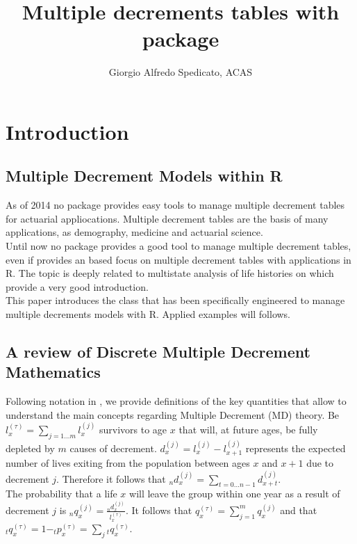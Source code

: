 \documentclass[nojss]{jss}
\author{Giorgio Alfredo Spedicato, ACAS}
\title{Multiple decrements tables with \pkg{lifecontingencies} package}
\begin{document}






\section{Introduction}

\subsection{Multiple Decrement Models within R}

As of 2014 no  package provides easy tools to manage multiple
decrement tables for actuarial appliocations. Multiple decrement tables are the basis of many applications, as demography, medicine and actuarial science.\\
Until now no  package provides a good tool to manage multiple
decrement tables, even if \cite{deshmukh2012multiple} provides an 
based focus on multiple decrement tables with applications in R. The topic is deeply related to multistate analysis of life histories on which \cite{willekens2014multistate} provide a very good introduction.\\

This paper introduces the  class that has been specifically engineered
to manage multiple decrements models with R. Applied examples will follows.\\

\subsection{A review of Discrete Multiple Decrement Mathematics}

Following notation in \cite{finanMLC}, we provide definitions of the key quantities that allow to understand the main concepts regarding Multiple Decrement (MD) theory. Be $l_x^{(\tau )} = \sum\limits_{j = 1 \ldots m} {l_x^{(j)}}$ survivors to age $x$ that will, at future ages, be fully depleted by $m$ causes of decrement. $d_{x}^{(j)}=l_{x}^{(j)}-l_{x+1}^{(j)}$ represents the expected number of lives exiting from the population between ages $x$ and $x + 1$ due to decrement $j$. Therefore it follows that $_nd_x^{(j)} = \sum\limits_{t = 0 \ldots n - 1} {d_{x + t}^{(j)}}$.\\
The probability that a life $x$ will leave the group within one year as a result of decrement $j$ is $_nq_x^{(j)} = \frac{{_nd_x^{(j)}}}{{l_x^{(\tau )}}}$. It follows that $q_x^{(\tau )} = \sum\limits_{j = 1}^m {q_x^{(j)}}$ and that $_tq_x^{(\tau )} = 1{ - _t}p_x^{(\tau )} = \sum\limits_j {_tq_x^{(\tau )}}$.
\end{document}
